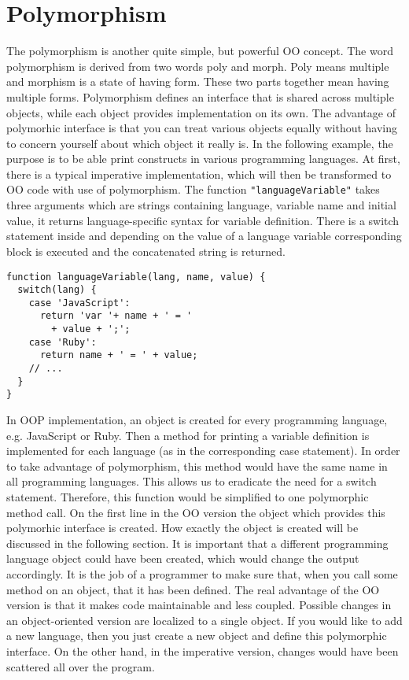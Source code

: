 \documentclass{bioinfo}
\begin{document}
\section{Polymorphism}
The polymorphism is another quite simple, but powerful OO concept. The word polymorphism is derived from two words poly and morph. Poly means multiple and morphism is a state of having form. These two parts together mean having multiple forms. Polymorphism defines an interface that is shared across multiple objects, while each object provides implementation on its own. The advantage of polymorhic interface is that you can treat various objects equally without having to concern yourself about which object it really is. 
In the following example, the purpose is to be able print constructs in various programming languages. At first, there is a typical imperative implementation, which will then be transformed to OO code with use of polymorphism. The function \texttt{"languageVariable"} takes three arguments which are strings containing language, variable name and initial value, it returns language-specific syntax for variable definition. There is a switch statement inside and depending on the value of a language variable corresponding block is executed and the concatenated string is returned.
\begin{lstlisting}
function languageVariable(lang, name, value) {
  switch(lang) {
    case 'JavaScript':
      return 'var '+ name + ' = ' 
        + value + ';';
    case 'Ruby':
      return name + ' = ' + value;
    // ... 
  }
}
\end{lstlisting}

In OOP implementation, an object is created for every programming language, e.g. JavaScript or Ruby. Then a method for printing a variable definition is implemented for each language (as in the corresponding case statement). In order to take advantage of polymorphism, this method would have the same name in all programming languages. This allows us to eradicate the need for a switch statement. Therefore, this function would be simplified to one polymorphic method call. On the first line in the OO version the object which provides this polymorhic interface is created. How exactly the object is created will be discussed in the following section. It is important that a different programming language object could have been created, which would change the output accordingly. It is the job of a programmer to make sure that, when you call some method on an object, that it has been defined. The real advantage of the OO version is that it makes code maintainable and less coupled. Possible changes in an object-oriented version are localized to a single object. If you would like to add a new language, then you just create a new object and define this polymorphic interface. On the other hand, in the imperative version, changes would have been scattered all over the program.
\end{document}
